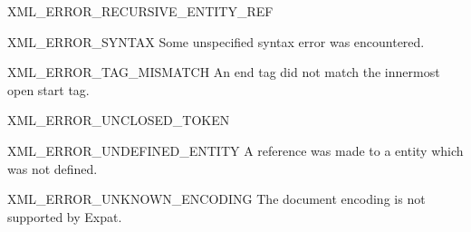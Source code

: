 \begin{datadesc}{XML_ERROR_RECURSIVE_ENTITY_REF}
\end{datadesc}

\begin{datadesc}{XML_ERROR_SYNTAX}
Some unspecified syntax error was encountered.
\end{datadesc}

\begin{datadesc}{XML_ERROR_TAG_MISMATCH}
An end tag did not match the innermost open start tag.
\end{datadesc}

\begin{datadesc}{XML_ERROR_UNCLOSED_TOKEN}
\end{datadesc}

\begin{datadesc}{XML_ERROR_UNDEFINED_ENTITY}
A reference was made to a entity which was not defined.
\end{datadesc}

\begin{datadesc}{XML_ERROR_UNKNOWN_ENCODING}
The document encoding is not supported by Expat.
\end{datadesc}
